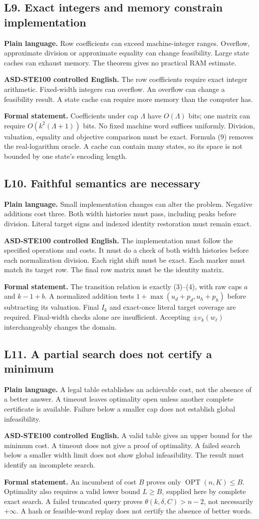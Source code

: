 \documentclass[11pt,letterpaper]{article}
\newcommand{\OPT}{\operatorname{OPT}}
\newcommand{\Plain}[1]{\par\textbf{\color{navy}Plain language.} #1\par}
\newcommand{\STE}[1]{\par\textbf{\color{teal}ASD-STE100 controlled English.} #1\par}
\newcommand{\Formal}[1]{\par\textbf{Formal statement.} #1\par}
\begin{document}
\clearpage
\subsection{L9. Exact integers and memory constrain implementation}
\Plain{Row coefficients can exceed machine-integer ranges. Overflow,
approximate division or approximate equality can change feasibility.
Large state caches can exhaust memory. The theorem gives no practical
RAM estimate.}
\STE{The row coefficients require exact integer arithmetic. Fixed-width integers can overflow. An overflow can change a feasibility result. A state cache can require more memory than the computer has.}
\Formal{Coefficients under cap \(\Lambda\) have \(O(\Lambda)\) bits;
one matrix can require \(O(k^2(\Lambda+1))\) bits.
No fixed machine word suffices uniformly.
Division, valuation, equality and objective comparison must be exact.
Formula (9) removes the real-logarithm oracle.
A cache can contain many states, so its space is not bounded by
one state's encoding length.}

\subsection{L10. Faithful semantics are necessary}
\Plain{Small implementation changes can alter the problem. Negative
additions cost three. Both width histories must pass, including
peaks before division. Literal target signs and indexed identity
restoration must remain exact.}
\STE{The implementation must follow the specified operations and costs. It must do a check of both width histories before each normalization division. Each right shift must be exact. Each marker must match its target row. The final row matrix must be the identity matrix.}
\Formal{The transition relation is exactly (3)--(4), with raw
caps \(a\) and \(k-1+b\).
A normalized addition tests
\(1+\max(u_d+p_d,u_h+p_h)\) before subtracting its valuation.
Final \(I_k\) and exact-once literal target coverage are required.
Final-width checks alone are insufficient. Accepting
\(\pm v_k(w_\ell)\) interchangeably changes the domain.}

\clearpage
\subsection{L11. A partial search does not certify a minimum}
\Plain{A legal table establishes an achievable cost, not the absence
of a better answer. A timeout leaves optimality open unless another
complete certificate is available. Failure below a smaller cap does
not establish global infeasibility.}
\STE{A valid table gives an upper bound for the minimum cost. A timeout does not give a proof of optimality. A failed search below a smaller width limit does not show global infeasibility. The result must identify an incomplete search.}
\Formal{An incumbent of cost \(B\) proves only
\(\OPT(n,K)\le B\). Optimality also requires a valid lower bound
\(L\ge B\), supplied here by complete exact search.
A failed truncated query proves \(\theta(k,\delta,C)>n-2\),
not necessarily \(+\infty\). A hash or feasible-word replay does
not certify the absence of better words.}
\end{document}
